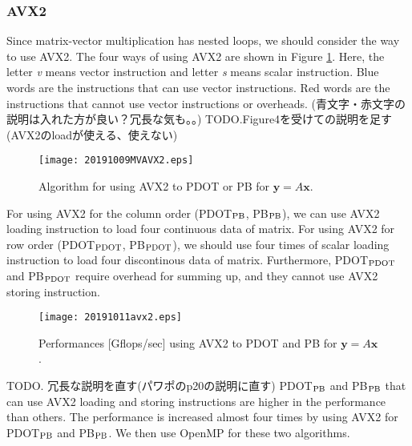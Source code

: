 \documentclass{IOS-Book-Article}
\begin{document}
\subsubsection{AVX2}
Since matrix-vector multiplication has nested loops, we should consider the way to use AVX2. 
The four ways of using AVX2 are shown in Figure \ref{figimpAVX}. 
Here, the letter {\it v} means vector instruction and letter {\it s} means scalar instruction. 
Blue words are the instructions that can use vector instructions. 
Red words are the instructions that cannot use vector instructions or overheads.
(青文字・赤文字の説明は入れた方が良い？冗長な気も。。)
TODO.Figure4を受けての説明を足す(AVX2のloadが使える、使えない)
\begin{figure}[htbp]
  \begin{center}
    \texttt{[image: 20191009MVAVX2.eps]}
    \caption{Algorithm for using AVX2 to PDOT or PB for $\bm{y} = A\bm{x}$.}
    \label{figimpAVX}
  \end{center}
\end{figure}

For using AVX2 for the column order (PDOT$_{\rm{PB}}$, PB$_{\rm{PB}}$), we can use AVX2 loading instruction to load four continuous data of matrix.
For using AVX2 for row order (PDOT$_{\rm{PDOT}}$, PB$_{\rm{PDOT}}$), we should use four times of scalar loading instruction to load four discontinous data of matrix.
Furthermore, PDOT$_{\rm{PDOT}}$ and PB$_{\rm{PDOT}}$ require overhead for summing up, and they cannot use AVX2 storing instruction.

\begin{figure}[htbp]
  \begin{center}
    \texttt{[image: 20191011avx2.eps]}
    \caption{Performances [Gflops/sec] using AVX2 to PDOT and PB for $\bm{y} = A\bm{x}$.}
    \label{figMV}
  \end{center}
\end{figure}

TODO. 冗長な説明を直す(パワポのp20の説明に直す)
PDOT$_{\rm{PB}}$ and PB$_{\rm{PB}}$ that can use AVX2 loading and storing instructions are higher in the performance than others.
The performance is increased almost four times by using AVX2 for PDOT$_{\rm{PB}}$ and PB$_{\rm{PB}}$. 
We then use OpenMP for these two algorithms. 
\end{document}
